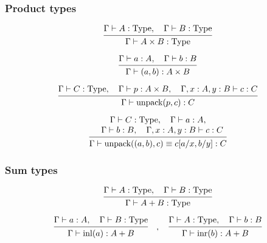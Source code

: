 \documentclass[conference]{IEEEtran}
\begin{document}
\subsubsection{Product types}

\[
\begin{prooftree}
    \hypo { \Gamma \vdash A : \type, \quad \Gamma \vdash B : \type }
    \infer1 { \Gamma \vdash A \times B : \type }
\end{prooftree}
\]

\[
\begin{prooftree}
    \hypo { \Gamma \vdash a : A, \quad \Gamma \vdash b : B }
    \infer1 { \Gamma \vdash (a, b) : A \times B }
\end{prooftree}
\]

\[
\begin{prooftree}
    \hypo { \Gamma \vdash C : \type, 
            \quad \Gamma \vdash p : A \times B,
            \quad \Gamma, x : A, y : B \vdash c : C }
    \infer1 { \Gamma \vdash \textrm{unpack}(p, c) : C }
\end{prooftree}
\]

\[
\begin{prooftree}
    \hypo { \Gamma \vdash C : \type, 
            \quad \Gamma \vdash a : A, }
    \infer[no rule]1 {
            \quad \Gamma \vdash b : B,
            \quad \Gamma, x : A, y : B \vdash c : C }
    \infer1 { \Gamma \vdash \textrm{unpack}((a, b), c) \equiv c[a/x, b/y] : C }
\end{prooftree}
\]

\subsubsection{Sum types}

\[
\begin{prooftree}
    \hypo { \Gamma \vdash A : \type, 
            \quad \Gamma \vdash B : \type }
    \infer1 { \Gamma \vdash A + B : \type }
\end{prooftree}
\]

\[
\begin{prooftree}
    \hypo { \Gamma \vdash a : A, 
            \quad \Gamma \vdash B : \type }
    \infer1 { \Gamma \vdash \textrm{inl}(a) : A + B }
\end{prooftree}
\quad , \quad
\begin{prooftree}
    \hypo { \Gamma \vdash A : \type,
            \quad \Gamma \vdash b : B }
    \infer1 { \Gamma \vdash \textrm{inr}(b) : A + B }
\end{prooftree}
\]
\end{document}
